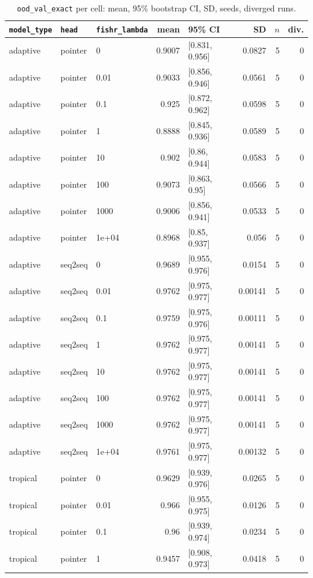 \documentclass[10pt]{article}
\begin{document}
{\small
\begin{longtable}{lllrlrrr}
\caption{\texttt{ood\_val\_exact} per cell: mean, 95\% bootstrap CI, SD, seeds, diverged runs.}\label{tab:summary-ood_val_exact}\\
\toprule
\texttt{model\_type} & \texttt{head} & \texttt{fishr\_lambda} & mean & 95\% CI & SD & $n$ & div.\\
\midrule
\endhead
adaptive & pointer & 0 & 0.9007 & [0.831, 0.956] & 0.0827 & 5 & 0\\
adaptive & pointer & 0.01 & 0.9033 & [0.856, 0.946] & 0.0561 & 5 & 0\\
adaptive & pointer & 0.1 & 0.925 & [0.872, 0.962] & 0.0598 & 5 & 0\\
adaptive & pointer & 1 & 0.8888 & [0.845, 0.936] & 0.0589 & 5 & 0\\
adaptive & pointer & 10 & 0.902 & [0.86, 0.944] & 0.0583 & 5 & 0\\
adaptive & pointer & 100 & 0.9073 & [0.863, 0.95] & 0.0566 & 5 & 0\\
adaptive & pointer & 1000 & 0.9006 & [0.856, 0.941] & 0.0533 & 5 & 0\\
adaptive & pointer & 1e+04 & 0.8968 & [0.85, 0.937] & 0.056 & 5 & 0\\
adaptive & seq2seq & 0 & 0.9689 & [0.955, 0.976] & 0.0154 & 5 & 0\\
adaptive & seq2seq & 0.01 & 0.9762 & [0.975, 0.977] & 0.00141 & 5 & 0\\
adaptive & seq2seq & 0.1 & 0.9759 & [0.975, 0.976] & 0.00111 & 5 & 0\\
adaptive & seq2seq & 1 & 0.9762 & [0.975, 0.977] & 0.00141 & 5 & 0\\
adaptive & seq2seq & 10 & 0.9762 & [0.975, 0.977] & 0.00141 & 5 & 0\\
adaptive & seq2seq & 100 & 0.9762 & [0.975, 0.977] & 0.00141 & 5 & 0\\
adaptive & seq2seq & 1000 & 0.9762 & [0.975, 0.977] & 0.00141 & 5 & 0\\
adaptive & seq2seq & 1e+04 & 0.9761 & [0.975, 0.977] & 0.00132 & 5 & 0\\
tropical & pointer & 0 & 0.9629 & [0.939, 0.976] & 0.0265 & 5 & 0\\
tropical & pointer & 0.01 & 0.966 & [0.955, 0.975] & 0.0126 & 5 & 0\\
tropical & pointer & 0.1 & 0.96 & [0.939, 0.974] & 0.0234 & 5 & 0\\
tropical & pointer & 1 & 0.9457 & [0.908, 0.973] & 0.0418 & 5 & 0\\

\end{longtable}}
\end{document}
